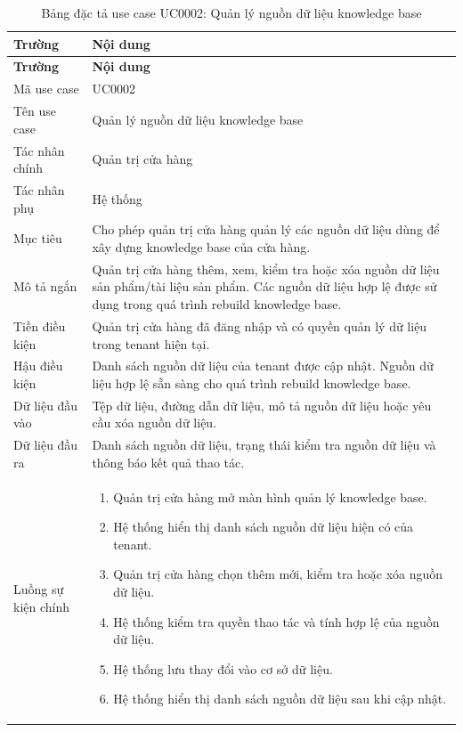 \documentclass[../DoAn.tex]{subfiles}
\begin{document}
\begin{longtable}{|p{}|p{}|}
\caption{Bảng đặc tả use case UC0002: Quản lý nguồn dữ liệu knowledge base}
\label{table:UC0002} \\
\hline
\textbf{Trường} & \textbf{Nội dung} \\
\hline
\endfirsthead

\hline
\textbf{Trường} & \textbf{Nội dung} \\
\hline
\endhead

Mã use case & UC0002 \\
\hline
Tên use case & Quản lý nguồn dữ liệu knowledge base \\
\hline
Tác nhân chính & Quản trị cửa hàng \\
\hline
Tác nhân phụ & Hệ thống \\
\hline
Mục tiêu & Cho phép quản trị cửa hàng quản lý các nguồn dữ liệu dùng để xây dựng knowledge base của cửa hàng. \\
\hline
Mô tả ngắn & Quản trị cửa hàng thêm, xem, kiểm tra hoặc xóa nguồn dữ liệu sản phẩm/tài liệu sản phẩm. Các nguồn dữ liệu hợp lệ được sử dụng trong quá trình rebuild knowledge base. \\
\hline
Tiền điều kiện & Quản trị cửa hàng đã đăng nhập và có quyền quản lý dữ liệu trong tenant hiện tại. \\
\hline
Hậu điều kiện & Danh sách nguồn dữ liệu của tenant được cập nhật. Nguồn dữ liệu hợp lệ sẵn sàng cho quá trình rebuild knowledge base. \\
\hline
Dữ liệu đầu vào & Tệp dữ liệu, đường dẫn dữ liệu, mô tả nguồn dữ liệu hoặc yêu cầu xóa nguồn dữ liệu. \\
\hline
Dữ liệu đầu ra & Danh sách nguồn dữ liệu, trạng thái kiểm tra nguồn dữ liệu và thông báo kết quả thao tác. \\
\hline
Luồng sự kiện chính &
\begin{minipage}[t]{0.68\textwidth}
\begin{enumerate}
    \item Quản trị cửa hàng mở màn hình quản lý knowledge base.
    \item Hệ thống hiển thị danh sách nguồn dữ liệu hiện có của tenant.
    \item Quản trị cửa hàng chọn thêm mới, kiểm tra hoặc xóa nguồn dữ liệu.
    \item Hệ thống kiểm tra quyền thao tác và tính hợp lệ của nguồn dữ liệu.
    \item Hệ thống lưu thay đổi vào cơ sở dữ liệu.
    \item Hệ thống hiển thị danh sách nguồn dữ liệu sau khi cập nhật.

\end{enumerate}
\end{minipage}
\end{longtable}
\end{document}
